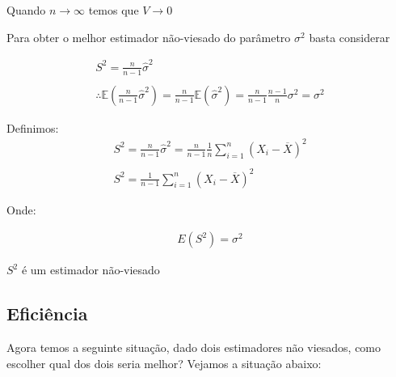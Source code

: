 \documentclass[
  letterpaper,
  DIV=11,
  numbers=noendperiod]{scrartcl}
\begin{document}
Quando \(n \rightarrow \infty\) temos que \(V \rightarrow 0\)

Para obter o melhor estimador não-viesado do parâmetro \(\sigma^2\)
basta considerar

\[\begin{array}{ccc}
S^2= \frac{n}{n-1} \hat{\sigma}^2
\\
\\
\therefore \mathbb{E}(\frac{n}{n-1} \hat{\sigma}^2)=\frac{n}{n-1} \mathbb{E}(\hat{\sigma}^2)=\frac{n}{n-1}\frac{n-1}{n} \sigma^2=\sigma^2
\end{array}\]

Definimos: \[\begin{array}{ccc}
S^2= \frac{n}{n-1} \hat{\sigma}^2 = \frac{n}{n-1}\frac{1}{n} \sum_{i=1}^{n}(X_i - \overline{X})^2
\\
\\
S^2=\frac{1}{n-1}\sum_{i=1}^{n}(X_i - \overline{X})^2
\end{array}\]

Onde:

\[\begin{array}{ccc}
E(S^2)=\sigma^2
\end{array}\]

\(S^2\) é um estimador não-viesado

\subsection{Eficiência}\label{eficiuxeancia}

Agora temos a seguinte situação, dado dois estimadores não viesados,
como escolher qual dos dois seria melhor? Vejamos a situação abaixo:
\end{document}
